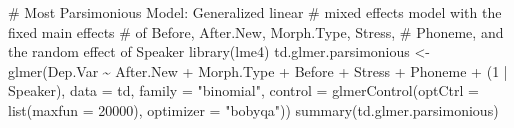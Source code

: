 \documentclass[
  10pt,
  letterpaper]{article}
\newenvironment{Shaded}{\begin{snugshade}}{\end{snugshade}}
\newcommand{\AttributeTok}[1]{\textcolor[rgb]{0.40,0.45,0.13}{#1}}
\newcommand{\CommentTok}[1]{\textcolor[rgb]{0.37,0.37,0.37}{#1}}
\newcommand{\DecValTok}[1]{\textcolor[rgb]{0.68,0.00,0.00}{#1}}
\newcommand{\FunctionTok}[1]{\textcolor[rgb]{0.28,0.35,0.67}{#1}}
\newcommand{\NormalTok}[1]{\textcolor[rgb]{0.00,0.23,0.31}{#1}}
\newcommand{\OtherTok}[1]{\textcolor[rgb]{0.00,0.23,0.31}{#1}}
\newcommand{\SpecialCharTok}[1]{\textcolor[rgb]{0.37,0.37,0.37}{#1}}
\newcommand{\StringTok}[1]{\textcolor[rgb]{0.13,0.47,0.30}{#1}}
\begin{document}
\begin{Shaded}
\begin{Highlighting}[]
\CommentTok{\# Most Parsimonious Model: Generalized linear}
\CommentTok{\# mixed effects model with the fixed main effects}
\CommentTok{\# of Before, After.New, Morph.Type, Stress,}
\CommentTok{\# Phoneme, and the random effect of Speaker}
\FunctionTok{library}\NormalTok{(lme4)}
\NormalTok{td.glmer.parsimonious }\OtherTok{\textless{}{-}} \FunctionTok{glmer}\NormalTok{(Dep.Var }\SpecialCharTok{\textasciitilde{}}\NormalTok{ After.New }\SpecialCharTok{+}
\NormalTok{    Morph.Type }\SpecialCharTok{+}\NormalTok{ Before }\SpecialCharTok{+}\NormalTok{ Stress }\SpecialCharTok{+}\NormalTok{ Phoneme }\SpecialCharTok{+}\NormalTok{ (}\DecValTok{1} \SpecialCharTok{|}\NormalTok{ Speaker),}
    \AttributeTok{data =}\NormalTok{ td, }\AttributeTok{family =} \StringTok{"binomial"}\NormalTok{, }\AttributeTok{control =} \FunctionTok{glmerControl}\NormalTok{(}\AttributeTok{optCtrl =} \FunctionTok{list}\NormalTok{(}\AttributeTok{maxfun =} \DecValTok{20000}\NormalTok{),}
        \AttributeTok{optimizer =} \StringTok{"bobyqa"}\NormalTok{))}
\FunctionTok{summary}\NormalTok{(td.glmer.parsimonious)}
\end{Highlighting}
\end{Shaded}
\end{document}
